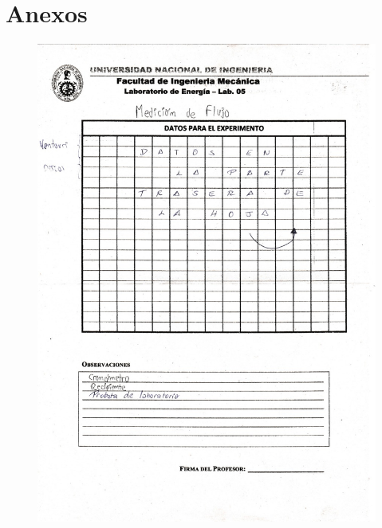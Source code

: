 \documentclass[a4paper,12pt]{report}
\begin{document}
\chapter*{Anexos}
\begin{figure}[H]
\centering
\includegraphics[scale=0.45]{datos1.jpeg}
\end{figure}
\end{document}
